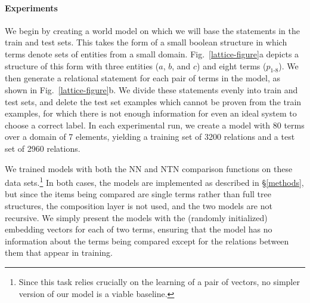 

\paragraph{Experiments}
We begin by creating a world model
on which we will base the statements in the train and test sets.
This takes the form of a small boolean structure in which terms denote
sets of entities from a small domain.  Fig.~\ref{lattice-figure}a
depicts a structure of this form with three entities ($a$, $b$, and $c$) and eight terms ($p_{1\text{-}8}$). We then generate a 
relational statement for each pair of terms in the model, as shown in Fig.~\ref{lattice-figure}b. 
We divide these statements evenly into train and test sets, and delete the test set
 examples which cannot be proven from the train examples, for which there is not enough information for even an ideal system to choose a correct label.
In each experimental run, we create a model with 80 terms over a domain of 7 elements, yielding a training set of 3200 relations and a test set of 
2960 relations.

We trained models with both the NN and NTN comparison functions on these
data sets.\footnote{Since this task relies crucially on the learning of a pair of vectors, no simpler version of our model is a viable baseline.} In both cases, the models are implemented as
described in \S\ref{methods}, but since the items being compared
are single terms rather than full tree structures, the composition
layer is not used, and the two models are not recursive. We simply present
the models with the (randomly initialized) embedding vectors for each
of two terms, ensuring that the model has no information about the terms
being compared except for the relations between them that appear in training.


